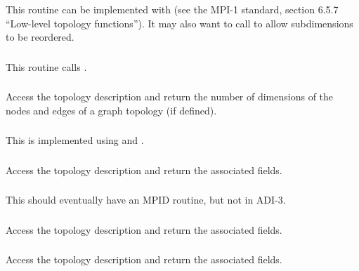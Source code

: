 \documentclass{article}
\begin{document}
\subsubsection{}
This routine can be implemented with  (see the MPI-1
standard, section 6.5.7 ``Low-level topology functions'').  It may also
want to call  to allow subdimensions to be reordered.

\subsubsection{}
This routine calls .

\subsubsection{}
Access the topology description and return the number of dimensions of
the nodes and edges of a graph topology (if defined).

\subsubsection{}
This is implemented using  and
. 

\subsubsection{}
Access the topology description and return the associated fields.

\subsubsection{}
This should eventually have an MPID routine, but not in ADI-3.

\subsubsection{}
Access the topology description and return the associated fields.

\subsubsection{}
Access the topology description and return the associated fields.
\end{document}

